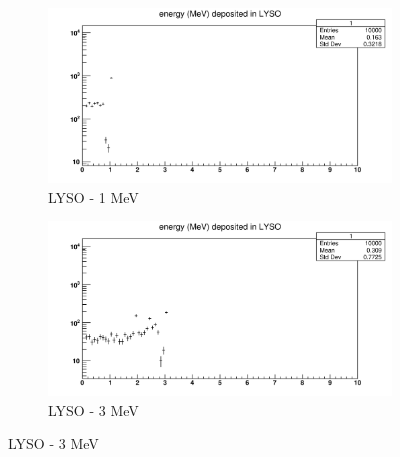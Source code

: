 \documentclass{article}
\begin{document}
\begin{figure}[H]
\medskip
\begin{subfigure}{0.48\textwidth}
\includegraphics[width=\linewidth]{images/task1/LYSO_1MeV.png}
\caption{LYSO - 1 MeV}
\end{subfigure}\hspace*{\fill}
\begin{subfigure}{0.48\textwidth}
\includegraphics[width=\linewidth]{images/task1/LYSO_3MeV.png}
\caption{LYSO - 3 MeV} 
\end{subfigure}


\end{figure}
\end{document}
